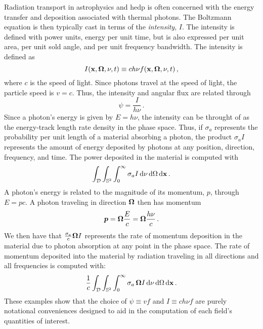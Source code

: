 \documentclass[../doc.tex]{subfiles}
\begin{document}
Radiation transport in astrophysics and \gls{hedp} is often concerned with the energy transfer and deposition associated with thermal photons. The Boltzmann equation is then typically cast in terms of the \emph{intensity}, $I$. The intensity is defined with power units, energy per unit time, but is also expressed per unit area, per unit sold angle, and per unit frequency bandwidth. The intensity is defined as 
	\begin{equation}
		I(\boldsymbol{\mathrm{x}},\boldsymbol{\Omega},\nu,t) \equiv c h \nu f(\boldsymbol{\mathrm{x}},\boldsymbol{\Omega},\nu,t) \,,
	\end{equation}
where $c$ is the speed of light. 
Since photons travel at the speed of light, the particle speed is $v = c$. 
Thus, the intensity and angular flux are related through 
	\begin{equation}
		\psi = \frac{I}{h\nu} \,. 
	\end{equation}
Since a photon's energy is given by $E = h\nu$, the intensity can be throught of as the energy-track length rate density in the phase space. 
Thus, if $\sigma_a$ represents the probability per unit length of a material absorbing a photon, the product $\sigma_a I$ represents the amount of energy deposited by photons at any position, direction, frequency, and time. 
The power deposited in the material is computed with 
	\begin{equation}
		\int_{\mathcal{D}} \int_{\mathbb{S}^2} \int_0^\infty \sigma_a I \mathop{}\!\mathrm{d} \nu \mathop{}\!\mathrm{d}\Omega \mathop{}\!\mathrm{d} \boldsymbol{\mathrm{x}} \,. 
	\end{equation}
A photon's energy is related to the magnitude of its momentum, $p$, through $E = p c$. A photon traveling in direction $\boldsymbol{\Omega}$ then has momentum 
	\begin{equation}
		\boldsymbol{p} = \boldsymbol{\Omega} \frac{E}{c} = \boldsymbol{\Omega} \frac{h \nu}{c} \,. 
	\end{equation}
We then have that $\frac{\sigma_a}{c}\boldsymbol{\Omega} I$ represents the rate of momentum deposition in the material due to photon absorption at any point in the phase space. 
The rate of momentum deposited into the material by radiation traveling in all directions and all frequencies is computed with:  
	\begin{equation}
		\frac{1}{c}\int_{\mathcal{D}} \int_{\mathbb{S}^2} \int_0^\infty \sigma_a\,\boldsymbol{\Omega} I \mathop{}\!\mathrm{d} \nu \mathop{}\!\mathrm{d} \Omega\mathop{}\!\mathrm{d} \boldsymbol{\mathrm{x}} \,. 
	\end{equation}
These examples show that the choice of $\psi \equiv vf$ and $I \equiv c h\nu f$ are purely notational conveniences designed to aid in the computation of each field's quantities of interest. 
\end{document}
